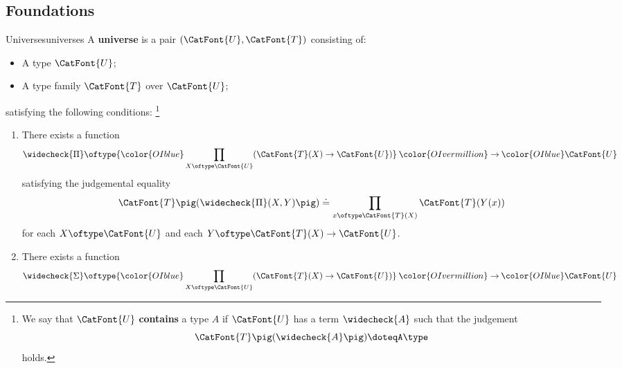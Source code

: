 \subsection{Foundations}\label{subsection-foundations}
\begin{definition}{Universes}{universes}%
    A \textbf{universe} is a pair $(\CatFont{U},\CatFont{T})$ consisting of:
    \begin{itemize}
        \item{}A type $\CatFont{U}$;
        \item{}A type family $\CatFont{T}$ over $\CatFont{U}$;
    \end{itemize}
    satisfying the following conditions:%
    \footnote{%
        We say that $\CatFont{U}$ \textbf{contains} a type $A$ if $\CatFont{U}$ has a term $\widecheck{A}$ such that the judgement
        \[
            \CatFont{T}\pig(\widecheck{A}\pig)%
            \doteq%
            A%
            \type
        \]%
        holds.
        \par\vspace*{\TCBBoxCorrection}
    }%
    \begin{enumerate}
        \item\label{universes-closure-under-dependent-products}There exists a function
            \[
                \widecheck{\Pi}%
                \oftype%
                {\color{OIblue}\prod_{X\oftype\CatFont{U}}(\CatFont{T}(X)\to\CatFont{U})}%
                \mathbin{\color{OIvermillion}\to}%
                {\color{OIblue}\CatFont{U}}%
            \]%
            satisfying the judgemental equality
            \[
                \CatFont{T}\pig(\widecheck{\Pi}(X,Y)\pig)%
                \doteq%
                \prod_{x\oftype\CatFont{T}(X)}\CatFont{T}(Y(x))%
            \]%
            for each $X\oftype\CatFont{U}$ and each $Y\oftype\CatFont{T}(X)\to\CatFont{U}$.
        \item\label{universes-closure-under-dependent-pairs}There exists a function
            \[
                \widecheck{\Sigma}%
                \oftype%
                {\color{OIblue}\prod_{X\oftype\CatFont{U}}(\CatFont{T}(X)\to\CatFont{U})}%
                \mathbin{\color{OIvermillion}\to}%
                {\color{OIblue}\CatFont{U}}%
\]
\end{enumerate}
\end{definition}

